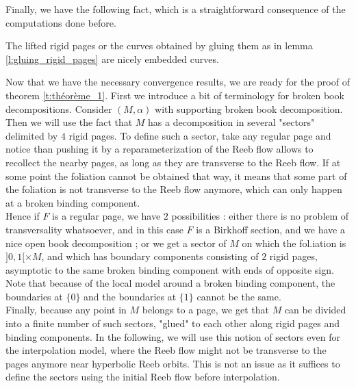 \documentclass[../main.tex]{subfiles}
\begin{document}
Finally, we have the following fact, which is a straightforward consequence of the computations done before.

\begin{lemma}\label{l:lifted_nice_curves}
The lifted rigid pages or the curves obtained by gluing them as in lemma \ref{l:gluing_rigid_pages} are nicely embedded curves. 
\end{lemma}

Now that we have the necessary convergence results, we are ready for the proof of theorem \ref{t:théorème_1}. First we introduce a bit of terminology for broken book decompositions. Consider $(M,\alpha)$ with supporting broken book decomposition. Then we will use the fact that $M$ has a decomposition in several "sectors" delimited by $4$ rigid pages. To define such a sector, take any regular page and notice than pushing it by a reparameterization of the Reeb flow allows to recollect the nearby pages, as long as they are transverse to the Reeb flow. If at some point the foliation cannot be obtained that way, it means that some part of the foliation is not transverse to the Reeb flow anymore, which can only happen at a broken binding component. \\
Hence if $F$ is a regular page, we have $2$ possibilities : either there is no problem of transversality whatsoever, and in this case $F$ is a Birkhoff section, and we have a nice open book decomposition ; or we get a sector of $M$ on which the fol.iation is $]0,1[\times M$, and which has boundary components consisting of $2$ rigid pages, asymptotic to the same broken binding component with ends of opposite sign. Note that because of the local model around a broken binding component, the boundaries at $\{0\}$ and the boundaries at $\{1\}$ cannot be the same. \\
Finally, because any point in $M$ belongs to a page, we get that $M$ can be divided into a finite number of such sectors, "glued" to each other along rigid pages and binding components. In the following, we will use this notion of sectors even for the interpolation model, where the Reeb flow might not be transverse to the pages anymore near hyperbolic Reeb orbits. This is not an issue as it suffices to define the sectors using the initial Reeb flow before interpolation.\\
\end{document}
